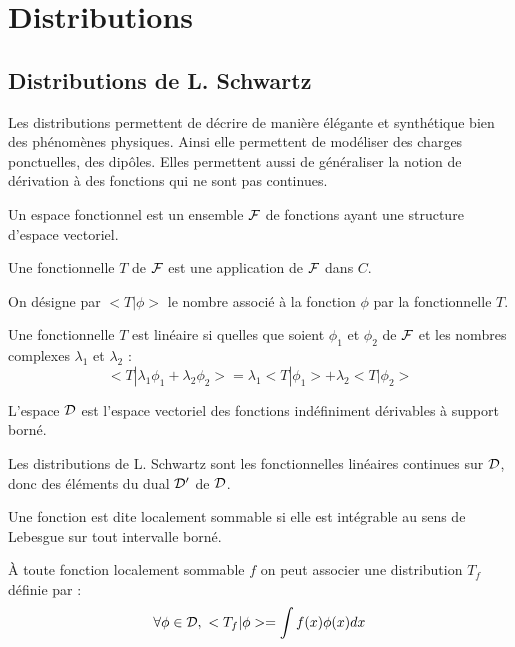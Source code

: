 \documentclass[12pt]{book}
\begin{document}
\appendix
\chapter{Distributions}
\section{Distributions de L. Schwartz}
Les distributions permettent de d\'ecrire de
mani\`ere \'el\'egante
et synth\'etique bien des ph\'enom\`enes physiques. Ainsi elle
permettent de mod\'eliser des charges ponctuelles, des dip\^oles.
Elles permettent aussi de g\'en\'eraliser la notion de d\'erivation
\`a des fonctions qui ne sont pas continues.
\begin{defn}
Un espace fonctionnel est un ensemble ${\cal F}$ de fonctions ayant
une structure d'espace vectoriel.
\end{defn}
\begin{defn}Une fonctionnelle $T$ de ${\cal F}$ est une application de
${\cal F}$ dans $C$.
\end{defn}
On d\'esigne par $<T|\phi>$ le nombre associ\'e \`a la fonction $\phi$ par la
fonctionnelle $T$.
\begin{defn}
Une fonctionnelle $T$ est lin\'eaire si quelles que soient $\phi_1$ et
$\phi_2$ de ${\cal F}$ et les nombres complexes $\lambda_1$ et
$\lambda_2$ :
\begin{equation}
<T|\lambda_1\phi_1+\lambda_2\phi_2> =
\lambda_1<T|\phi_1>+\lambda_2<T|\phi_2> 
\end{equation}
\end{defn}
\begin{defn}
L'espace ${\cal D}$ est l'espace vectoriel des fonctions
ind\'efiniment d\'erivables \`a support born\'e.
\end{defn}
\begin{defn}
Les distributions de L. Schwartz sont les fonctionnelles lin\'eaires
continues sur ${\cal D}$, donc des \'el\'ements du dual ${\cal D}'$ de
${\cal D}$.
\end{defn}
\begin{defn}
Une fonction est dite localement sommable si elle est int\'egrable au
sens de Lebesgue sur tout intervalle born\'e.
\end{defn}
\begin{defn}
\`A toute fonction localement sommable $f$ on peut associer une
distribution $T_f$ d\'efinie par :
\begin{equation}
\forall \phi \in {\cal D},\ <T_f|\phi>=\int f(x)\phi(x)dx
\end{equation}
\end{defn}
\end{document}
